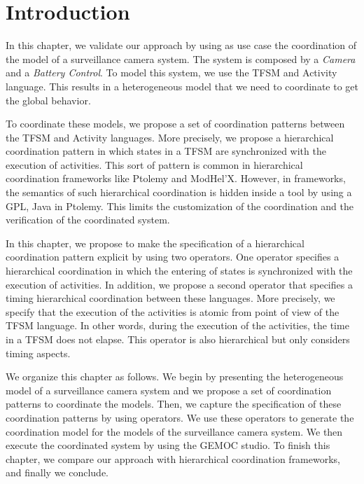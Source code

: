 \section{Introduction}
In this chapter, we validate our approach by using as use case the coordination of the model of a surveillance camera system. The system is composed by a \emph{Camera} and a \emph{Battery Control}. To model this system, we use the TFSM and Activity language. This results in a heterogeneous model that we need to coordinate to get the global behavior.   

To coordinate these models, we propose a set of coordination patterns between the TFSM and Activity languages. More precisely, we propose a hierarchical coordination pattern in which states in a TFSM are synchronized with the execution of activities. This sort of pattern is common in hierarchical coordination frameworks like Ptolemy and ModHel'X. However, in frameworks, the semantics of such hierarchical coordination is hidden inside a tool by using a GPL, \eg Java in Ptolemy. This limits the customization of the coordination and the verification of the coordinated system.  

In this chapter, we propose to make the specification of a hierarchical coordination pattern explicit by using two \bcool operators. One operator specifies a hierarchical coordination in which the entering of states is synchronized with the execution of activities. In addition, we propose a second operator that specifies a timing hierarchical coordination between these languages. More precisely, we specify that the execution of the activities is atomic from point of view of the TFSM language. In other words, during the execution of the activities, the time in a TFSM does not elapse. This operator is also hierarchical but only considers timing aspects.

We organize this chapter as follows. We begin by presenting the heterogeneous model of a surveillance camera system and we propose a set of coordination patterns to coordinate the models. Then, we capture the specification of these coordination patterns by using \bcool operators. We use these operators to generate the coordination model for the models of the surveillance camera system. We then execute the coordinated system by using the GEMOC studio. To finish this chapter, we compare our approach with hierarchical coordination frameworks, and finally we conclude.  